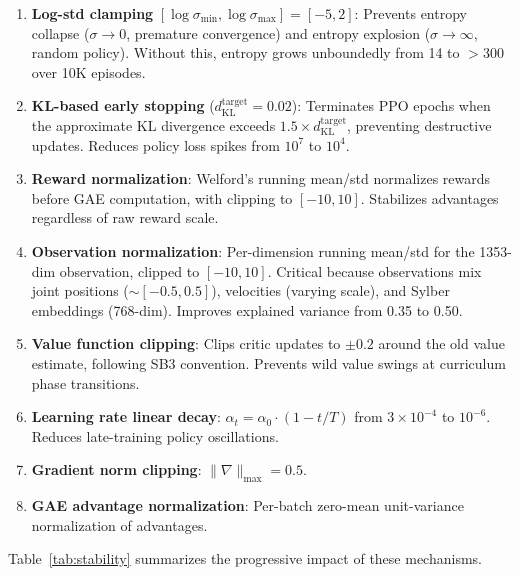 \documentclass[11pt, a4paper]{article}
\begin{document}
\begin{enumerate}
    \item \textbf{Log-std clamping} $[\log\sigma_{\min}, \log\sigma_{\max}] = [-5, 2]$: Prevents entropy collapse ($\sigma \to 0$, premature convergence) and entropy explosion ($\sigma \to \infty$, random policy). Without this, entropy grows unboundedly from 14 to $>$300 over 10K episodes.

    \item \textbf{KL-based early stopping} ($d_{\text{KL}}^{\text{target}} = 0.02$): Terminates PPO epochs when the approximate KL divergence exceeds $1.5 \times d_{\text{KL}}^{\text{target}}$, preventing destructive updates. Reduces policy loss spikes from $10^7$ to $10^4$.

    \item \textbf{Reward normalization}: Welford's running mean/std normalizes rewards before GAE computation, with clipping to $[-10, 10]$. Stabilizes advantages regardless of raw reward scale.

    \item \textbf{Observation normalization}: Per-dimension running mean/std for the 1353-dim observation, clipped to $[-10, 10]$. Critical because observations mix joint positions ($\sim$$[-0.5, 0.5]$), velocities (varying scale), and Sylber embeddings (768-dim). Improves explained variance from 0.35 to 0.50.

    \item \textbf{Value function clipping}: Clips critic updates to $\pm 0.2$ around the old value estimate, following SB3 convention. Prevents wild value swings at curriculum phase transitions.

    \item \textbf{Learning rate linear decay}: $\alpha_t = \alpha_0 \cdot (1 - t/T)$ from $3 \times 10^{-4}$ to $10^{-6}$. Reduces late-training policy oscillations.

    \item \textbf{Gradient norm clipping}: $\|\nabla\|_{\max} = 0.5$.

    \item \textbf{GAE advantage normalization}: Per-batch zero-mean unit-variance normalization of advantages.
\end{enumerate}

Table~\ref{tab:stability} summarizes the progressive impact of these mechanisms.
\end{document}
